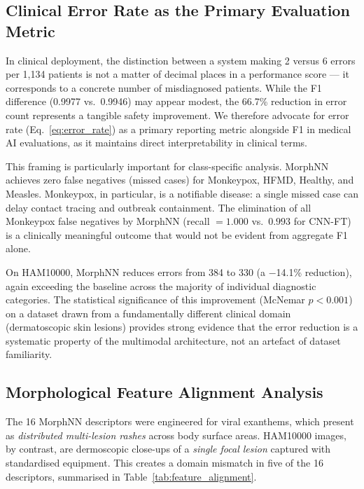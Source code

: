 \documentclass[preprint,12pt]{elsarticle}
\begin{document}
\subsection{Clinical Error Rate as the Primary Evaluation Metric}
\label{sec:discuss_error}

In clinical deployment, the distinction between a system making 2 versus
6 errors per 1,134 patients is not a matter of decimal places in a
performance score --- it corresponds to a concrete number of
misdiagnosed patients.  While the F1 difference (0.9977 vs.\ 0.9946)
may appear modest, the 66.7\% reduction in error count represents a
tangible safety improvement.  We therefore advocate for error rate
(Eq.~\eqref{eq:error_rate}) as a primary reporting metric alongside
F1 in medical AI evaluations, as it maintains direct interpretability in
clinical terms.

This framing is particularly important for class-specific analysis.
MorphNN achieves zero false negatives (missed cases) for Monkeypox,
HFMD, Healthy, and Measles.  Monkeypox, in particular, is a notifiable
disease: a single missed case can delay contact tracing and outbreak
containment.  The elimination of all Monkeypox false negatives by
MorphNN (recall $= 1.000$ vs.\ $0.993$ for CNN-FT) is a clinically
meaningful outcome that would not be evident from aggregate F1 alone.

On HAM10000, MorphNN reduces errors from 384 to 330 (a $-$14.1\%
reduction), again exceeding the baseline across the majority of
individual diagnostic categories.  The statistical significance of this
improvement (McNemar $p < 0.001$) on a dataset drawn from a
fundamentally different clinical domain (dermatoscopic skin lesions)
provides strong evidence that the error reduction is a systematic
property of the multimodal architecture, not an artefact of dataset
familiarity.


\subsection{Morphological Feature Alignment Analysis}
\label{sec:feature_alignment}

The 16 MorphNN descriptors were engineered for viral exanthems, which
present as \emph{distributed multi-lesion rashes} across body surface
areas.  HAM10000 images, by contrast, are dermoscopic close-ups of a
\emph{single focal lesion} captured with standardised equipment.  This
creates a domain mismatch in five of the 16 descriptors, summarised in
Table~\ref{tab:feature_alignment}.
\end{document}
